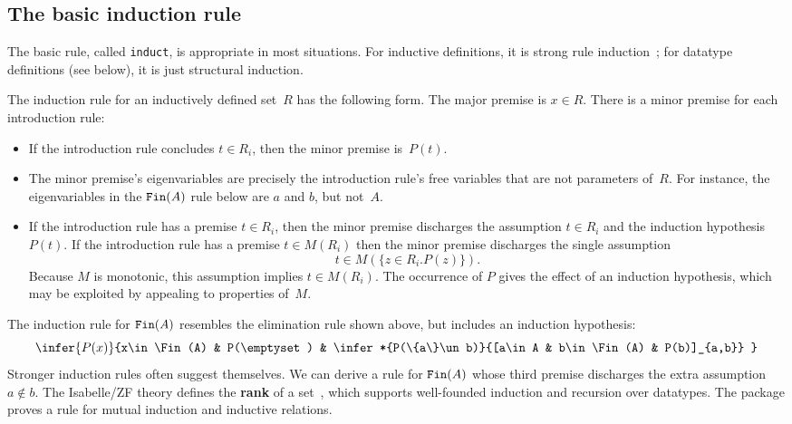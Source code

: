 \subsection{The basic induction rule}\label{basic-ind-sec}
The basic rule, called {\tt induct}, is appropriate in most situations.
For inductive definitions, it is strong rule induction~\cite{camilleri92}; for
datatype definitions (see below), it is just structural induction.  

The induction rule for an inductively defined set~$R$ has the following form.
The major premise is $x\in R$.  There is a minor premise for each
introduction rule:
\begin{itemize}
\item If the introduction rule concludes $t\in R_i$, then the minor premise
is~$P(t)$.

\item The minor premise's eigenvariables are precisely the introduction
rule's free variables that are not parameters of~$R$.  For instance, the
eigenvariables in the $\hbox{\tt Fin}(A)$ rule below are $a$ and $b$, but not~$A$.

\item If the introduction rule has a premise $t\in R_i$, then the minor
premise discharges the assumption $t\in R_i$ and the induction
hypothesis~$P(t)$.  If the introduction rule has a premise $t\in M(R_i)$
then the minor premise discharges the single assumption
\[ t\in M(\{z\in R_i. P(z)\}). \] 
Because $M$ is monotonic, this assumption implies $t\in M(R_i)$.  The
occurrence of $P$ gives the effect of an induction hypothesis, which may be
exploited by appealing to properties of~$M$.
\end{itemize}
The induction rule for $\hbox{\tt Fin}(A)$ resembles the elimination rule shown above,
but includes an induction hypothesis:
\[ \infer{P(x)}{x\in\Fin(A) & P(\emptyset)
        & \infer*{P(\{a\}\un b)}{[a\in A & b\in\Fin(A) & P(b)]_{a,b}} }
\] 
Stronger induction rules often suggest themselves.  We can derive a rule
for $\hbox{\tt Fin}(A)$ whose third premise discharges the extra assumption $a\not\in
b$.  The Isabelle/ZF theory defines the {\bf rank} of a
set~\cite[\S3.4]{paulson-set-II}, which supports well-founded induction and
recursion over datatypes.  The package proves a rule for mutual induction
and inductive relations.

